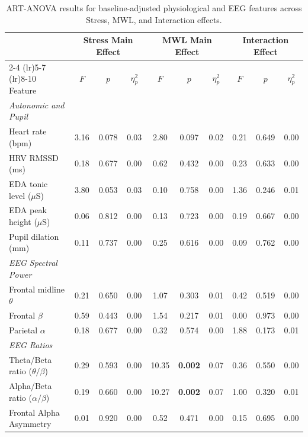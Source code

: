 \documentclass[lettersize,journal]{IEEEtran}
\begin{document}
\begin{table}[!t]
\centering
\caption{ART-ANOVA results for baseline-adjusted physiological and EEG features across Stress, MWL, and Interaction effects.}
\label{tab:anova_omnibus}
\begin{tabular}{lccccccccc}
\toprule
 & \multicolumn{3}{c}{\textbf{Stress Main Effect}} & \multicolumn{3}{c}{\textbf{MWL Main Effect}} & \multicolumn{3}{c}{\textbf{Interaction Effect}} \\
\cmidrule(lr){2-4} \cmidrule(lr){5-7} \cmidrule(lr){8-10}
Feature & $F$ & $p$ & $\eta^2_{p}$ & $F$ & $p$ & $\eta^2_{p}$ & $F$ & $p$ & $\eta^2_{p}$ \\
\midrule
\textit{Autonomic and Pupil} & & & & & & & & & & \\
Heart rate (bpm) & 3.16 & 0.078 & 0.03 & 2.80 & 0.097 & 0.02 & 0.21 & 0.649 & 0.00 \\
HRV RMSSD (ms) & 0.18 & 0.677 & 0.00 & 0.62 & 0.432 & 0.00 & 0.23 & 0.633 & 0.00 \\
EDA tonic level ($\mu$S) & 3.80 & 0.053 & 0.03 & 0.10 & 0.758 & 0.00 & 1.36 & 0.246 & 0.01 \\
EDA peak height ($\mu$S) & 0.06 & 0.812 & 0.00 & 0.13 & 0.723 & 0.00 & 0.19 & 0.667 & 0.00 \\
Pupil dilation (mm) & 0.11 & 0.737 & 0.00 & 0.25 & 0.616 & 0.00 & 0.09 & 0.762 & 0.00 \\
\addlinespace
\textit{EEG Spectral Power} & & & & & & & & & & \\
Frontal midline $\theta$ & 0.21 & 0.650 & 0.00 & 1.07 & 0.303 & 0.01 & 0.42 & 0.519 & 0.00 \\
Frontal $\beta$ & 0.59 & 0.443 & 0.00 & 1.54 & 0.217 & 0.01 & 0.00 & 0.973 & 0.00 \\
Parietal $\alpha$ & 0.18 & 0.677 & 0.00 & 0.32 & 0.574 & 0.00 & 1.88 & 0.173 & 0.01 \\
\addlinespace
\textit{EEG Ratios} & & & & & & & & & & \\
Theta/Beta ratio ($\theta/\beta$) & 0.29 & 0.593 & 0.00 & 10.35 & \textbf{0.002} & 0.07 & 0.36 & 0.550 & 0.00 \\
Alpha/Beta ratio ($\alpha/\beta$) & 0.19 & 0.660 & 0.00 & 10.27 & \textbf{0.002} & 0.07 & 1.00 & 0.320 & 0.01 \\
Frontal Alpha Asymmetry & 0.01 & 0.920 & 0.00 & 0.52 & 0.471 & 0.00 & 0.15 & 0.695 & 0.00 \\
\bottomrule
\end{tabular}
\end{table}
\end{document}
